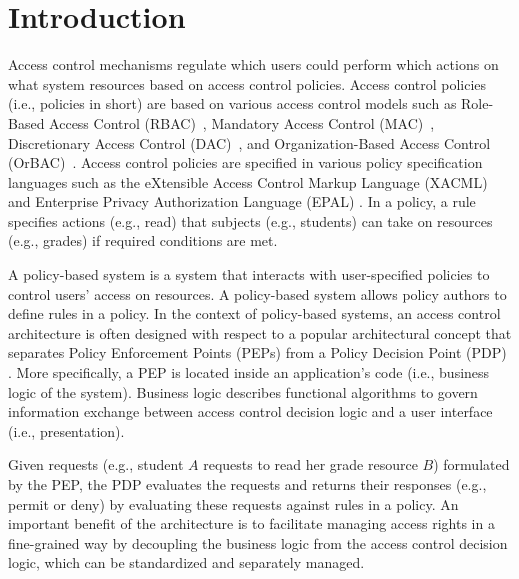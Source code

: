 \section{Introduction} \label{sec:introduction}

Access control mechanisms regulate which users
could perform which actions on what system resources based on access control policies.
Access control policies (i.e., policies in short) are based on various access control models such as Role-Based Access Control (RBAC)~\cite{ferraiolo:rbac}, Mandatory Access Control (MAC)~\cite{mac}, Discretionary Access Control (DAC)~\cite{dac}, and Organization-Based Access Control (OrBAC)~\cite{orbac}.
Access control policies are specified in various policy specification languages such
as the eXtensible Access Control Markup Language (XACML) \cite{sunxacml}
and Enterprise Privacy Authorization Language (EPAL) \cite{epal}.
In a policy, a rule specifies actions (e.g., read) that subjects (e.g., students) can take on resources (e.g., grades) if required conditions are met.



A policy-based system is a system that interacts with user-specified policies
to control users' access on resources. A policy-based system allows policy authors to define rules in a policy.
In the context of policy-based systems, an access control architecture is often designed with respect to a popular
architectural concept that separates Policy Enforcement Points (PEPs) from a Policy Decision Point (PDP) \cite{separation}. More specifically, a PEP is located inside an 
application's code (i.e., business logic of the system).
Business logic describes functional algorithms to govern information exchange between access control decision logic and a user interface (i.e., presentation).

Given requests (e.g., student $A$ requests to read her grade resource $B$) formulated by the PEP, the PDP evaluates the requests and returns their responses (e.g., permit or deny) by evaluating these requests
against rules in a policy. An important benefit of the architecture is to facilitate managing access rights in a fine-grained way by
decoupling the business logic from the access control decision logic, which can be standardized and separately managed.


